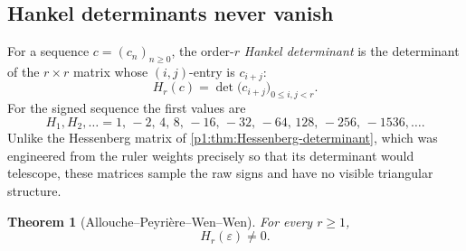 \documentclass[11pt,oneside]{article}
\numberwithin{equation}{section}
\newtheorem{theorem}{Theorem}[section]
\theoremstyle{definition}
\theoremstyle{remark}
\newcommand{\eps}{\varepsilon}
\begin{document}
\subsection{Hankel determinants never vanish}

For a sequence \(c=(c_n)_{n\ge0}\), the order-\(r\) \emph{Hankel
determinant} is the determinant of the \(r\times r\) matrix whose
\((i,j)\)-entry is \(c_{i+j}\):
\begin{equation}
  H_r(c)=\det\bigl(c_{i+j}\bigr)_{0\le i,j<r}.
  \label{p1:eq:hankel-definition}
\end{equation}
For the signed sequence the first values are
\begin{equation}
  H_1,H_2,\ldots=
  1,\,-2,\,4,\,8,\,-16,\,-32,\,-64,\,128,\,-256,\,-1536,\ldots.
  \label{p1:eq:hankel-first-values}
\end{equation}
Unlike the Hessenberg matrix of \cref{p1:thm:Hessenberg-determinant}, which was
engineered from the ruler weights precisely so that its determinant would
telescope, these matrices sample the raw signs and have no visible
triangular structure.

\begin{theorem}[Allouche--Peyri\`ere--Wen--Wen]
\label{p1:thm:hankel-nonzero}
For every \(r\ge1\),
\begin{equation}
  \boxed{H_r(\eps)\ne0.}
  \label{p1:eq:hankel-nonzero}
\end{equation}
\end{theorem}
\end{document}
